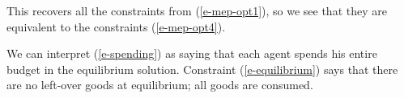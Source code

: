 \documentclass[12pt]{article}
\begin{document}
This recovers all the constraints from (\ref{e-mep-opt1}), so we see that they
are equivalent to the constraints (\ref{e-mep-opt4}).

We can interpret (\ref{e-spending}) as saying that each agent spends his entire
budget in the equilibrium solution. Constraint (\ref{e-equilibrium}) says that
there are no left-over goods at equilibrium; all goods are consumed.

\newpage


\end{document}
